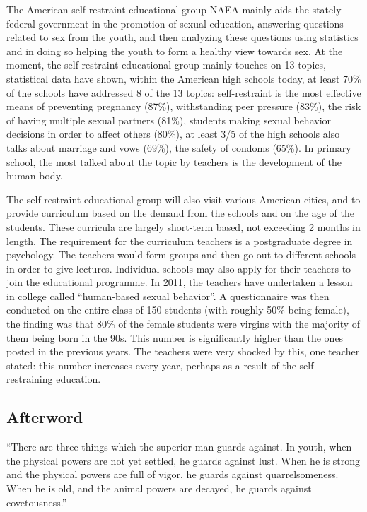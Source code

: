\documentclass[
]{book}
\begin{document}
The American self-restraint educational group NAEA mainly aids the stately federal government in the promotion of sexual education, answering questions related to sex from the youth, and then analyzing these questions using statistics and in doing so helping the youth to form a healthy view towards sex. At the moment, the self-restraint educational group mainly touches on 13 topics, statistical data have shown, within the American high schools today, at least 70\% of the schools have addressed 8 of the 13 topics: self-restraint is the most effective means of preventing pregnancy (87\%), withstanding peer pressure (83\%), the risk of having multiple sexual partners (81\%), students making sexual behavior decisions in order to affect others (80\%), at least 3/5 of the high schools also talks about marriage and vows (69\%), the safety of condoms (65\%). In primary school, the most talked about the topic by teachers is the development of the human body.

The self-restraint educational group will also visit various American cities, and to provide curriculum based on the demand from the schools and on the age of the students. These curricula are largely short-term based, not exceeding 2 months in length. The requirement for the curriculum teachers is a postgraduate degree in psychology. The teachers would form groups and then go out to different schools in order to give lectures. Individual schools may also apply for their teachers to join the educational programme. In 2011, the teachers have undertaken a lesson in college called ``human-based sexual behavior''. A questionnaire was then conducted on the entire class of 150 students (with roughly 50\% being female), the finding was that 80\% of the female students were virgins with the majority of them being born in the 90s. This number is significantly higher than the ones posted in the previous years. The teachers were very shocked by this, one teacher stated: this number increases every year, perhaps as a result of the self-restraining education.

\hypertarget{afterword-1}{%
\subsection{Afterword}\label{afterword-1}}

``There are three things which the superior man guards against. In youth, when the physical powers are not yet settled, he guards against lust. When he is strong and the physical powers are full of vigor, he guards against quarrelsomeness. When he is old, and the animal powers are decayed, he guards against covetousness.''
\end{document}
